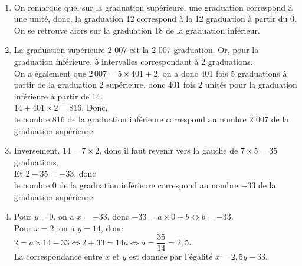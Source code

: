 \begin{corrige} 
\ \\ [-5mm]
   \begin{enumerate}
      \item On remarque que, sur la graduation supérieure, une graduation correspond à une unité, donc, la graduation 12 correspond à la 12 graduation à partir du 0. On se retrouve alors sur la {\blue graduation 18} de la graduation inférieur.
      \item La graduation supérieure 2 007 est la 2 007  graduation. Or, pour la graduation inférieure, 5 intervalles correspondant à 2 graduations. \\
         On a également que $2\,007=5\times401+2$, on a donc 401 fois 5 graduations à partir de la graduation 2 supérieure, donc 401 fois 2 unités pour la graduation inférieure à partir de 14. \\
         $14+401\times2 =816$. Donc, \\
         {\blue le nombre 816 de la graduation inférieure correspond au nombre 2 007 de la graduation supérieure.}
      \item Inversement, $14 =7\times2$, donc il faut revenir vers la gauche de $7\times5 =35$ graduations. \\
         Et $2-35 =-33$, donc \\
         {\blue le nombre 0 de la graduation inférieure correspond au nombre $-33$ de la graduation supérieure.}
      \item Pour $y=0$, on a $x =-33$, donc $-33 =a\times0+b \iff b =-33$. \\
         Pour $x=2$, on a $y =14$, donc $2 =a\times14-33 \iff 2+33 =14a \iff a =\dfrac{35}{14} =2,5$. \\ [1mm]
         {\blue La correspondance entre $x$ et $y$ est donnée par l'égalité $x =2,5y-33$.}
   \end{enumerate}
\end{corrige}

\bigskip


